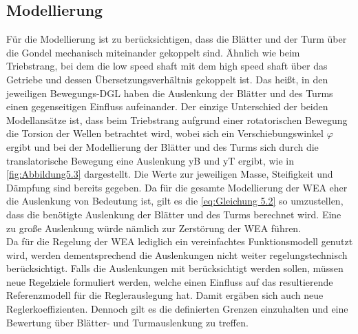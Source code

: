 \subsection{Modellierung}

Für die Modellierung ist zu berücksichtigen, dass die Blätter und der Turm über die Gondel mechanisch miteinander gekoppelt sind. Ähnlich wie beim Triebstrang, bei dem die low speed shaft mit dem high speed shaft über das Getriebe und dessen Übersetzungsverhältnis gekoppelt ist. Das heißt, in den jeweiligen Bewegungs-DGL haben die Auslenkung der Blätter und des Turms einen gegenseitigen Einfluss aufeinander. Der einzige Unterschied der beiden Modellansätze ist, dass beim Triebstrang aufgrund einer rotatorischen Bewegung die Torsion der Wellen betrachtet wird, wobei sich ein Verschiebungswinkel $\varphi$ ergibt und bei der Modellierung der Blätter und des Turms sich durch die translatorische Bewegung eine Auslenkung \acs{yB} und \acs{yT} ergibt, wie in \autoref{fig:Abbildung5.3} dargestellt. Die Werte zur jeweiligen Masse, Steifigkeit und Dämpfung sind bereits gegeben. Da für die gesamte Modellierung der WEA eher die Auslenkung von Bedeutung ist, gilt es die \autoref{eq:Gleichung 5.2} so umzustellen, dass die benötigte Auslenkung der Blätter und des Turms berechnet wird. Eine zu große Auslenkung würde nämlich zur Zerstörung der WEA führen.
\\
Da für die Regelung der WEA lediglich ein vereinfachtes Funktionsmodell genutzt wird, werden dementsprechend die Auslenkungen nicht weiter regelungstechnisch berücksichtigt. Falls die Auslenkungen mit berücksichtigt werden sollen, müssen neue Regelziele formuliert werden, welche einen Einfluss auf das resultierende Referenzmodell für die Reglerauslegung hat. Damit ergäben sich auch neue Reglerkoeffizienten. Dennoch gilt es die definierten Grenzen einzuhalten und eine Bewertung über Blätter- und Turmauslenkung zu treffen.

